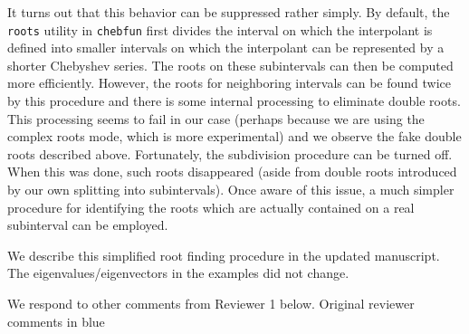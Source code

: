 \documentclass{article}
\begin{document}
It turns out that this behavior can be suppressed rather
simply. By default, the \texttt{roots}
utility in \texttt{chebfun} first divides the interval on
which the interpolant is defined into smaller intervals on which
the interpolant can be represented by a shorter Chebyshev series.
The roots on these subintervals can then be computed more efficiently.
However, the roots for neighboring intervals can be found twice
by this procedure and there is some internal processing to eliminate
double roots. This processing seems to fail in our case (perhaps because
we are using the complex roots mode, which is more experimental) and
we observe the fake double roots described above. Fortunately, the
subdivision procedure can be turned off. When this was done, such
roots disappeared (aside from double roots introduced by our
own splitting into subintervals). Once aware of this issue,
a much simpler procedure for identifying the roots which are actually
contained on a real subinterval can be employed.

We describe this simplified root finding procedure in the updated
manuscript. The eigenvalues/eigenvectors in the examples
did not change.

We respond to other comments from Reviewer 1 below. Original
reviewer comments in {\color{blue} blue}
\end{document}

